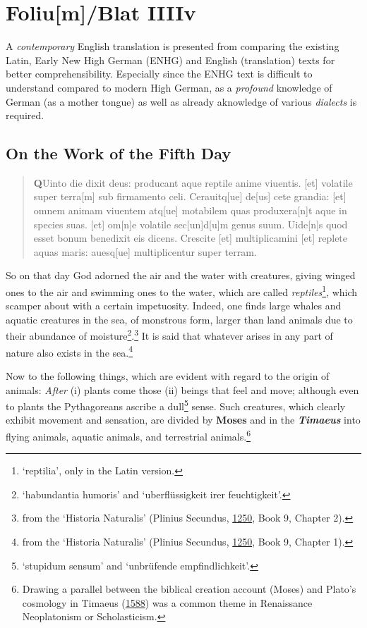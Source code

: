 \documentclass[
]{article}
\author{Dietmar Gerald Schrausser}
\date{09.05.2026}
\begin{document}
\hypertarget{foliumblat-iiiiv}{%
\section{Foliu{[}m{]}/Blat IIIIv}\label{foliumblat-iiiiv}}

A \emph{contemporary} English translation is presented from comparing
the existing Latin, Early New High German (ENHG) and English
(translation) texts for better comprehensibility. Especially since the
ENHG text is difficult to understand compared to modern High German, as
a \emph{profound} knowledge of German (as a mother tongue) as well as
already aknowledge of various \emph{dialects} is required.

\hypertarget{on-the-work-of-the-fifth-day}{%
\subsection{On the Work of the Fifth
Day}\label{on-the-work-of-the-fifth-day}}

\begin{quote}
\textbf{Q}Uinto die dixit deus: producant aque reptile anime viuentis.
{[}et{]} volatile super terra{[}m{]} sub firmamento celi.
Cerauitq{[}ue{]} de{[}us{]} cete grandia: {[}et{]} omnem animam viuentem
atq{[}ue{]} motabilem quas produxera{[}n{]}t aque in species suas.
{[}et{]} om{[}n{]}e volatile sec{[}un{]}d{[}u{]}m genus suum.
Uide{[}n{]}s quod esset bonum benedixit eis dicens. Crescite {[}et{]}
multiplicamini {[}et{]} replete aquas maris: auesq{[}ue{]}
multiplicentur super terram.
\end{quote}

So on that day God adorned the air and the water with creatures, giving
winged ones to the air and swimming ones to the water, which are called
\emph{reptiles}\footnote{`reptilia', only in the Latin version.}, which
scamper about with a certain impetuosity. Indeed, one finds large whales
and aquatic creatures in the sea, of monstrous form, larger than land
animals due to their abundance of moisture\footnote{`habundantia
  humoris' and `uberflüssigkeit irer feuchtigkeit'.}.\footnote{from the
  `Historia Naturalis' (Plinius Secundus,
  \href{https://gallica.bnf.fr/ark:/12148/btv1b550140045/}{1250}, Book
  9, Chapter 2).} It is said that whatever arises in any part of nature
also exists in the sea.\footnote{from the `Historia Naturalis' (Plinius
  Secundus,
  \href{https://gallica.bnf.fr/ark:/12148/btv1b550140045/}{1250}, Book
  9, Chapter 1).}

Now to the following things, which are evident with regard to the origin
of animals: \emph{After} (i) plants come those (ii) beings that feel and
move; although even to plants the Pythagoreans ascribe a dull\footnote{`stupidum
  sensum' and `unbrüfende empfindlichkeit'.} sense. Such creatures,
which clearly exhibit movement and sensation, are divided by
\textbf{Moses} and in the \textbf{\emph{Timaeus}} into flying animals,
aquatic animals, and terrestrial animals.\footnote{Drawing a parallel
  between the biblical creation account (Moses) and Plato's cosmology in
  Timaeus (\href{https://doi.org/10.3931/e-rara-24349}{1588}) was a
  common theme in Renaissance Neoplatonism or Scholasticism.}
\end{document}
